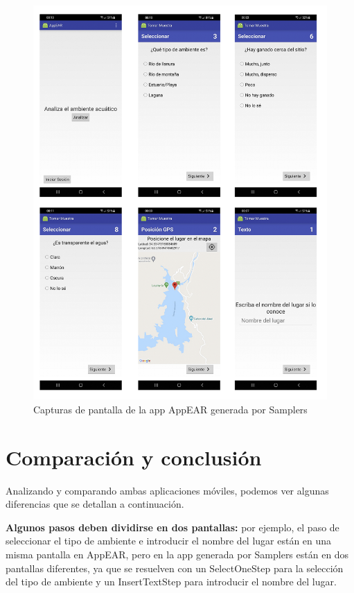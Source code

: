 \begin{figure}[H]
  \centering
   \includegraphics[scale=0.5]{06-caso_de_uso/capturas_appear_samplers.png} 
    \caption{Capturas de pantalla de la app AppEAR generada por Samplers}
\end{figure}

\section{Comparación y conclusión}
Analizando y comparando ambas aplicaciones móviles, podemos ver algunas diferencias que se detallan a continuación.


\textbf{Algunos pasos deben dividirse en dos pantallas:} por ejemplo, el paso de seleccionar el tipo de ambiente e introducir el nombre del lugar están en una misma pantalla en AppEAR, pero en la app generada por Samplers están en dos pantallas diferentes, ya que se resuelven con un SelectOneStep para la selección del tipo de ambiente y un InsertTextStep para introducir el nombre del lugar.


